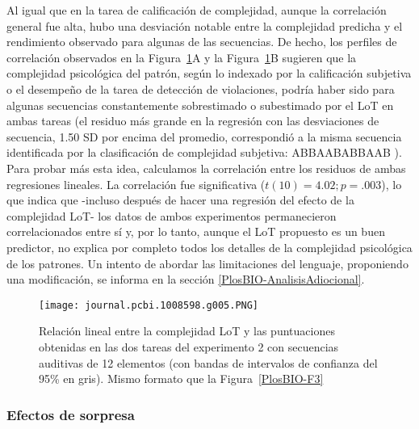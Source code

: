 Al igual que en la tarea de calificación de complejidad, aunque la correlación general fue alta, hubo una desviación notable entre la complejidad predicha y el rendimiento observado para algunas de las secuencias. De hecho, los perfiles de correlación observados en la Figura~\ref{PlosBIO-F5}A y la Figura~\ref{PlosBIO-F5}B sugieren que la complejidad psicológica del patrón, según lo indexado por la calificación subjetiva o el desempeño de la tarea de detección de violaciones, podría haber sido para algunas secuencias constantemente sobrestimado o subestimado por el LoT en ambas tareas (el residuo más grande en la regresión con las desviaciones de secuencia, 1.50 SD por encima del promedio, correspondió a la misma secuencia identificada por la clasificación de complejidad subjetiva: ABBAABABBAAB ). Para probar más esta idea, calculamos la correlación entre los residuos de ambas regresiones lineales. La correlación fue significativa ($t (10) = 4.02; p  = .003$), lo que indica que -incluso después de hacer una regresión del efecto de la complejidad LoT- los datos de ambos experimentos permanecieron correlacionados entre sí y, por lo tanto, aunque el LoT propuesto es un buen predictor, no explica por completo todos los detalles de la complejidad psicológica de los patrones. Un intento de abordar las limitaciones del lenguaje, proponiendo una modificación, se informa en la sección \ref{PlosBIO-AnalisisAdiocional}.

\begin{figure}[t!]
      \texttt{[image: journal.pcbi.1008598.g005.PNG]}
      \centering
      \caption{Relación lineal entre la complejidad LoT y las puntuaciones obtenidas en las dos tareas del experimento 2 con secuencias auditivas de 12 elementos (con bandas de intervalos de confianza del 95\% en gris). Mismo formato que la Figura~\ref{PlosBIO-F3}}
      \label{PlosBIO-F5}
\end{figure}

\subsubsection{Efectos de sorpresa}

